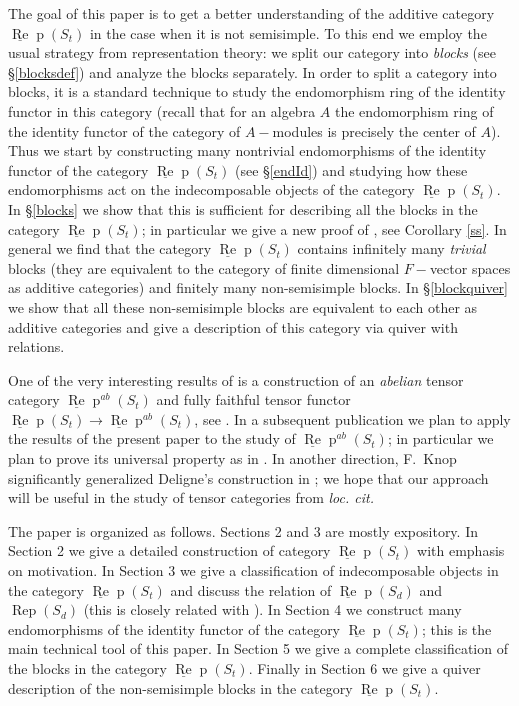 \documentclass{amsart}
\theoremstyle{definition}
\def\uRep{\underline{\operatorname{Re}}\!\operatorname{p}}
\newcommand{\Rep}{\operatorname{Rep}}
\renewcommand{\1}{_{(1)}}
\renewcommand{\2}{_{(2)}}
\newcommand{\3}{_{(3)}}
\newcommand{\4}{_{(4)}}
\begin{document}
The goal of this paper is to get a better understanding of the additive category $\uRep(S_t)$ in the case
when it is not semisimple. To this end we employ the usual strategy from representation theory:
we split our category into {\em blocks} (see \S \ref{blocksdef}) and analyze the blocks separately. 
In order to split a category into blocks, it is a standard technique to study
the endomorphism ring of the identity functor in this category (recall that for an algebra $A$
the endomorphism ring of the identity functor of the category of $A-$modules is precisely the
center of $A$). 
Thus we start by constructing many nontrivial endomorphisms of the identity functor of
the category $\uRep(S_t)$ (see \S \ref{endId}) and studying how these endomorphisms act on 
the indecomposable objects of the category $\uRep(S_t)$. In \S \ref{blocks} we show that this is
sufficient for describing all the blocks in the category $\uRep(S_t)$; in particular
we give a new proof of \cite[Th\'eor\`eme 2.18]{Del07}, see Corollary \ref{ss}. In general we find
that the category $\uRep(S_t)$ contains infinitely many {\em trivial} blocks (they are equivalent
to the category of finite dimensional $F-$vector spaces as additive categories) and finitely many
non-semisimple blocks. In \S \ref{blockquiver} we show that all these non-semisimple blocks are
equivalent to each other as additive categories and give a description of this category via
quiver with relations.

One of the very interesting results of \cite{Del07} is a construction of an {\em abelian} tensor
category $\uRep^{ab}(S_t)$ and fully faithful tensor functor $\uRep(S_t)\to \uRep^{ab}(S_t)$, 
see \cite[Proposition 8.19]{Del07}. In a subsequent publication we plan to apply the
results of the present paper to the study of $\uRep^{ab}(S_t)$; in particular we plan to prove
its universal property as in \cite[Conjecture 8.21]{Del07}. In another direction, F.~Knop
significantly generalized Deligne's construction in \cite{MR2349713}; we hope that our
approach will be useful in the study of tensor categories from {\em loc. cit.}


The paper is organized as follows. Sections 2 and 3 are mostly expository. In Section 2 
we give a detailed construction of category $\uRep(S_t)$ with emphasis on motivation. 
In Section 3 we give a classification of indecomposable objects in the category $\uRep(S_t)$
and discuss the relation of $\uRep(S_d)$ and $\Rep(S_d)$ (this is closely related with 
\cite[\S 5-6]{Del07}). In Section 4 we construct many
endomorphisms of the identity functor of the category $\uRep(S_t)$; this is the main technical
tool of this paper. In Section 5 we give a complete classification of the blocks in the category
$\uRep(S_t)$. Finally in Section 6 we give a quiver description of the non-semisimple blocks
in the category $\uRep(S_t)$.
\end{document}
